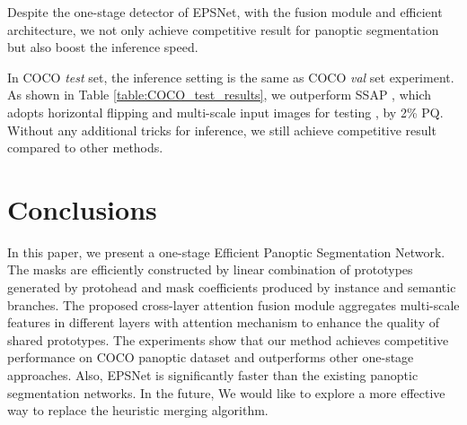 \documentclass[runningheads]{llncs}
\begin{document}
Despite the one-stage detector of EPSNet, with the fusion module and efficient architecture, we not only achieve competitive result for panoptic segmentation but also boost the inference speed. 

In COCO \emph{test} set, the inference setting is the same as COCO \emph{val} set experiment. As shown in Table \ref{table:COCO_test_results}, we outperform SSAP \cite{Porzi2019}, which adopts horizontal flipping and multi-scale input images for testing , by 2\% PQ. Without any additional tricks for inference, we still achieve competitive result compared to other methods.

\section{Conclusions}
In this paper, we present a one-stage Efficient Panoptic Segmentation Network. The masks are efficiently constructed by linear combination of prototypes generated by protohead and mask coefficients produced by instance and semantic branches. The proposed cross-layer attention fusion module aggregates multi-scale features in different layers with attention mechanism to enhance the quality of shared prototypes. The experiments show that our method achieves competitive performance on COCO panoptic dataset and outperforms other one-stage approaches. Also, EPSNet is significantly faster than the existing panoptic segmentation networks. 
In the future, We would like to explore a more effective way to replace the heuristic merging algorithm.










\end{document}
